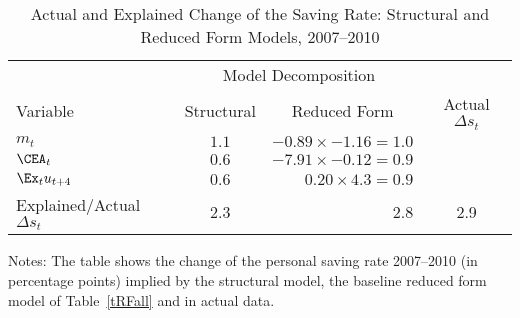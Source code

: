 \hypertarget{tPred}{}
\begin{table}[H]
\begin{center}
\caption{ Actual and Explained Change of the Saving Rate: Structural and Reduced Form Models, 2007--2010} \label{tGRdecomp}
\begin{tabular}{@{}lcrc@{}}\\
\toprule
      & \multicolumn{2}{c}{Model Decomposition}& \\
      \cmidrule(l){2-3}
     Variable & \multicolumn{1}{c}{Structural }& \multicolumn{1}{c}{Reduced Form }& \multicolumn{1}{c}{Actual $\Delta s_t$ }\\
\midrule
$m_t$ & $ 1.1 $ & $ -0.89 \times -1.16 = 1.0 $ & \\
$\CEA_t$ & $ 0.6 $ & $ -7.91 \times -0.12 = 0.9 $ &  \\
$\Ex_t u_{t+4} $ & $ 0.6 $ & $ 0.20 \times 4.3 = 0.9 $ & \\\midrule
Explained/Actual $\Delta s_t$ &  2.3 &  2.8 & 2.9\\
\bottomrule
\end{tabular}
\end{center}
 {\footnotesize Notes: The table shows the change of the personal saving rate 2007--2010 (in percentage points) implied by the structural model, the baseline reduced form model of Table~\ref{tRFall} and in actual data. }
\end{table}
